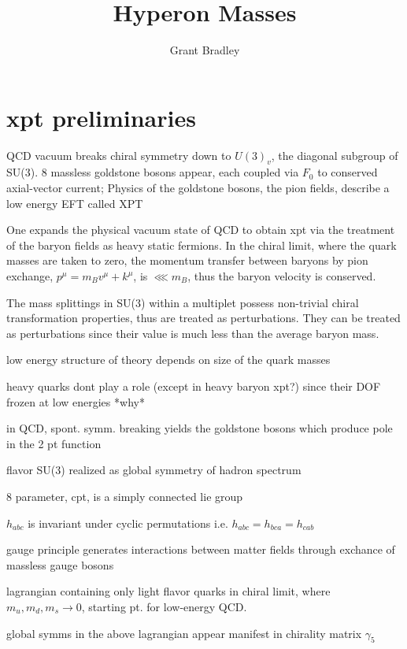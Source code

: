 \documentclass[12pt,tightenlines, raggedbottom, prd, notitlepage]{revtex4-1}
\begin{document}
\title{Hyperon Masses}
\author{Grant Bradley}
\maketitle

\section*{xpt preliminaries}

QCD vacuum breaks chiral symmetry down to $U(3)_v$, the diagonal subgroup of SU(3).
8 massless goldstone bosons appear, each coupled via $F_0$ to conserved axial-vector current; 
Physics of the goldstone bosons, the pion fields, describe a low energy EFT called XPT 
  
One expands the physical vacuum state of QCD to obtain xpt via the treatment of the baryon fields as heavy static fermions.
In the chiral limit, where the quark masses are taken to zero, the momentum transfer between baryons by pion exchange, $p^\mu = m_Bv^\mu + k^\mu$,
is $\lll m_B$, thus the baryon velocity is conserved.

The mass splittings in SU(3) within a multiplet possess non-trivial chiral transformation properties, thus are treated as perturbations.
They can be treated as perturbations since their value is much less than the average baryon mass.






low energy structure of theory depends on size of the quark masses

heavy quarks dont play a role (except in heavy baryon xpt?) since their DOF frozen at low energies *why*

in QCD, spont. symm. breaking yields the goldstone bosons which produce pole in the 2 pt function 

flavor SU(3) realized as global symmetry of hadron spectrum 

8 parameter, cpt, is a simply connected lie group 

$h_{abc}$ is invariant under cyclic permutations i.e. $h_{abc} = h_{bca} = h_{cab}$

gauge principle generates interactions between matter fields through exchance of massless gauge bosons 

lagrangian containing only light flavor quarks in chiral limit, where $m_u, m_d, m_s \rightarrow 0$, starting pt. for low-energy QCD. 

global symms in the above lagrangian appear manifest in chirality matrix $\gamma_5$
\end{document}
